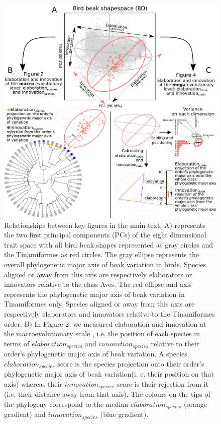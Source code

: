 \documentclass[12pt,letterpaper]{article}
\providecommand{\DIFaddbegin}{} %
\newcommand{\DIFaddincludegraphics}[2][]{{\color{blue}\fbox{\DIFOincludegraphics[#1]{#2}}}} %
\DeclareRobustCommand{\DIFaddbegin}{\DIFOaddbegin \let\includegraphics\DIFaddincludegraphics} %
\begin{document}
\DIFaddbegin \begin{figure}[!htbp]
\centering
   \includegraphics[width=1\textwidth]{Figures/cheat_sheet.pdf}
\caption{\scriptsize{Relationships between key figures in the main text.
A) represents the two first principal components (PCs) of the eight dimensional trait space with all bird beak shapes represented as gray circles and the Tinamiformes as red circles.
The gray ellipse represents the overall phylogenetic major axis of beak variation in birds.
Species aligned or away from this axis are respectively elaborators or innovators relative to the class Aves.
The red ellipse and axis represents the phylogenetic major axis of beak variation in Tinamiformes only.
Species aligned or away from this axis are respectively elaborators and innovators relative to the Tinamiformes order.
B) In Figure 2, we measured elaboration and innovation at the macroevolutionary scale , i.e. the position of each species in terms of $elaboration_{species}$ and $innovation_{species}$ relative to their order's phylogenetic major axis of beak variation.
A species $elaboration_{species}$ score is the species projection onto their order's phylogenetic major axis of beak variation(i. e. their position on that axis) whereas their $innovation_{species}$ score is their rejection from it (i.e. their distance away from that axis).
The colours on the tips of the phylogeny correspond to the median $elaboration_{species}$ (orange gradient) and $innovation_{species}$ (blue gradient).
}}
\end{figure}
\end{document}
